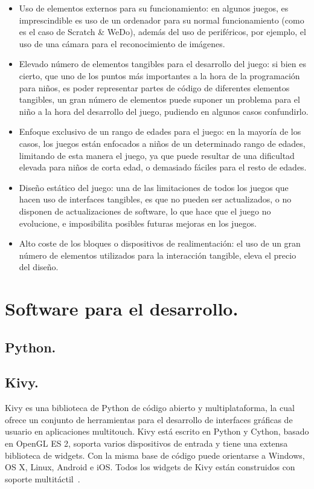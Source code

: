 \begin{itemize}
\item Uso de elementos externos para su funcionamiento: en algunos juegos, es
imprescindible es uso de un ordenador para su normal funcionamiento (como es
el caso de Scratch \& WeDo), además del uso de periféricos, por ejemplo, el uso
de una cámara para el reconocimiento de imágenes.
\item Elevado número de elementos tangibles para el desarrollo del juego: si bien es
cierto, que uno de los puntos más importantes a la hora de la programación para
niños, es poder representar partes de código de diferentes elementos tangibles,
un gran número de elementos puede suponer un problema para el niño a la hora
del desarrollo del juego, pudiendo en algunos casos confundirlo.
\item Enfoque exclusivo de un rango de edades para el juego: en la mayoría de los
casos, los juegos están enfocados a niños de un determinado rango de edades,
limitando de esta manera el juego, ya que puede resultar de una dificultad
elevada para niños de corta edad, o demasiado fáciles para el resto de edades.
\item Diseño estático del juego: una de las limitaciones de todos los juegos que hacen
uso de interfaces tangibles, es que no pueden ser actualizados, o no disponen de
actualizaciones de software, lo que hace que el juego no evolucione, e
imposibilita posibles futuras mejoras en los juegos.
\item Alto coste de los bloques o dispositivos de realimentación: el uso de un gran
número de elementos utilizados para la interacción tangible, eleva el precio del
diseño.
\end{itemize}

\section{Software para el desarrollo.}
\subsection{Python.}

\subsection{Kivy.}
Kivy es una biblioteca de Python de código abierto y multiplataforma, la cual ofrece un conjunto de herramientas para el desarrollo de interfaces gráficas de usuario en aplicaciones multitouch.
Kivy está escrito en Python y Cython, basado en OpenGL ES 2, soporta varios dispositivos de entrada y tiene una extensa biblioteca de widgets. Con la misma base de código puede orientarse a Windows, OS X, Linux, Android e iOS. Todos los widgets de Kivy están construidos con soporte multitáctil~\cite{Kivy}. 

